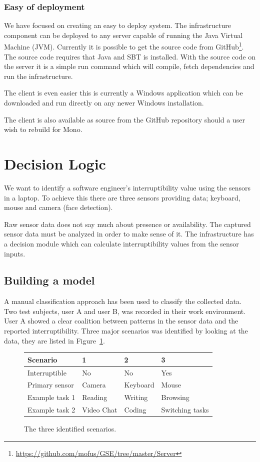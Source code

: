 \documentclass{sigchi}
\begin{document}
\subsubsection{Easy of deployment}
We have focused on creating an easy to deploy system.
The infrastructure component can be deployed to any server capable of running the Java Virtual Machine (JVM).
Currently it is possible to get the source code from GitHub\footnote{\url{https://github.com/mofus/GSE/tree/master/Server}}.
The source code requires that Java and SBT is installed.
With the source code on the server it is a simple run command which will compile, fetch dependencies and run the infrastructure.

The client is even easier this is currently a Windows application which can be downloaded and run directly on any newer Windows installation.

The client is also available as source from the GitHub repository should a user wish to rebuild for Mono.

\section{Decision Logic}
We want to identify a software engineer’s interruptibility value using the sensors in a laptop.
To achieve this there are three sensors providing data; keyboard, mouse and camera (face detection).

Raw sensor data does not say much about presence or availability.
The captured sensor data must be analyzed in order to make sense of it.
The infrastructure has a decision module which can calculate interruptibility values from the sensor inputs.

\subsection{Building a model}
A manual classification approach has been used to classify the collected data.
Two test subjects, user A and user B, was recorded in their work environment.
User A showed a clear coalition between patterns in the sensor data and the reported interruptibility.
Three major scenarios was identified by looking at the data, they are listed in Figure~\ref{fig:scenarios}.

\begin{figure}[H]
  \centering
      \begin{tabular}{@{}llll@{}}
      \toprule
      \textbf{Scenario} & \textbf{1} & \textbf{2} & \textbf{3}      \\ \midrule
      Interruptible     & No         & No         & Yes             \\
      Primary sensor    & Camera     & Keyboard   & Mouse           \\
      Example task 1    & Reading    & Writing    & Browsing        \\
      Example task 2    & Video Chat & Coding     & Switching tasks \\ \bottomrule
      \end{tabular}
  \caption{The three identified scenarios.}
  \label{fig:scenarios}
\end{figure}
\end{document}
